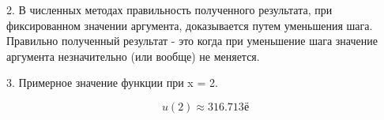 \documentclass[12pt]{report}
\begin{document}

2. В численных методах правильность полученного результата, при 
фиксированном значении аргумента, доказывается путем уменьшения шага.
Правильно полученный результат - это когда при уменьшение 
шага значение аргумента незначительно (или вообще) не меняется.

3. Примерное значение функции при x = 2.


\begin{equation}
	u(2) \approx 316.713
	\label{eq:ref4}ё
\end{equation}


	
	
	
\end{document}
